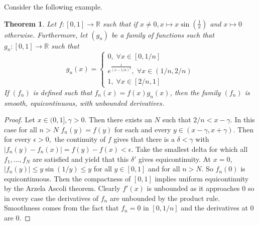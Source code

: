 \documentclass[letter]{article}
\newtheorem{theorem}{Theorem}
\newenvironment{menumerate}{%
  \edef\backupindent{\the\parindent}%
  \enumerate%
  \setlength{\parindent}{\backupindent}%
}{\endenumerate}
\begin{document}
\begin{menumerate}
	\setcounter{enumi}{21}
	\item %
	Consider the following example. 
	\begin{theorem}
		Let $f:[0,1] \to \mathbb{R}$ such that if $x \neq 0, x \mapsto x\sin\left(\frac{1}{x}\right)$ and $x\mapsto 0$ otherwise. Furthermore,
		let $(g_n)$ be a family of functions such that $g_n : [0,1] \to \mathbb{R}$ such that
		$$g_n(x) = \left\{
                \begin{array}{ll}
                  0,\;\forall x \in [0,1/n] \\
                  e^{\frac{1}{(x-1/n)^2}},\;\forall x \in (1/n,2/n)\\
                  1,\;\forall x \in [2/n,1]
                \end{array}
              \right.$$
        If $(f_n)$ is defined such that $f_n(x) = f(x)g_n(x)$, then the family $(f_n)$ is smooth, equicontinuous, with unbounded derivatives.
	\end{theorem}
	\begin{proof}
		Let $x\in (0,1], \gamma > 0.$ Then there exists an $N$ such that $2/n < x-\gamma.$
		 In this case for all $n>N$ $f_n(y) = f(y)$ for each and every $y \in (x-\gamma,x+\gamma).$
		 Then for every $\epsilon > 0,$ the continuity of $f$ gives that there is a $\delta < \gamma$ with $|f_n(y) - f_n(x)| = f(y)-f(x) < \epsilon.$
		 Take the smallest delta for which all $f_1,\dots,f_N$ are satisfied and yield that this $\delta'$ gives equicontinuity. At $x = 0$, $|f_n(y)| \leq y\sin(1/y)\leq y$ for all $y \in [0,1]$ and for all $n > N.$ So  $f_n(0)$ is equicontinuous. Then the compactness of $[0,1]$ implies uniform equicontinuity by the Arzela Ascoli theorem.
		 Clearly $f'(x)$ is unbounded as it approaches $0$ so in every case the derivatives of $f_n$ are unbounded by the product rule.
		 Smoothness comes from the fact that $f_n = 0$ in $[0,1/n]$ and the derivatives at $0$ are $0.$
	\end{proof}
\end{menumerate}	
\end{document}
